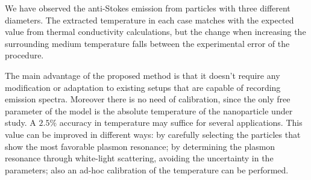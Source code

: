 We have observed the anti-Stokes emission from particles with three different
diameters. The extracted temperature in each case matches with the expected
value from thermal conductivity calculations, but the change when increasing the
surrounding medium temperature falls between the experimental error of the
procedure.

The main advantage of the proposed method is that it doesn't require any
modification or adaptation to existing setups that are capable of recording
emission spectra. Moreover there is no need of calibration, since the only free
parameter of the model is the absolute temperature of the nanoparticle under
study. A $2.5\%$ accuracy in temperature may suffice for several applications.
This value can be improved in different ways: by carefully selecting the
particles that show the most favorable plasmon resonance; by determining the
plasmon resonance through white-light scattering, avoiding the uncertainty in
the parameters; also an ad-hoc calibration of the temperature can be
performed.

